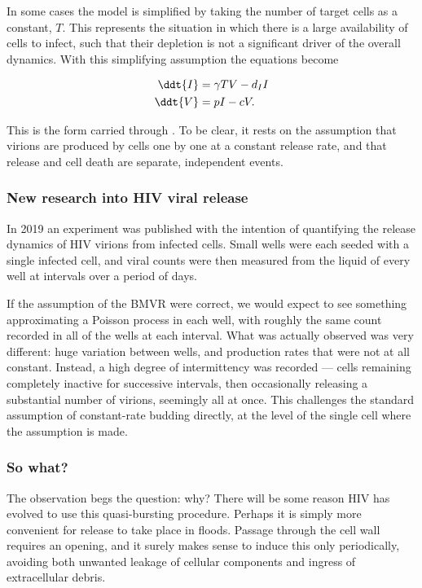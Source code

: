 \noindent
In some cases the model is simplified by taking the number of target cells as a
constant, $T$. This represents the situation in which there is a large
availability of cells to infect, such that their depletion is not a significant
driver of the overall dynamics. With this simplifying assumption the equations
become

\begin{align*}
\ddt{I} & = \gamma T V - d_I I\\
\ddt{V}& = p I - c V.
\end{align*}

\noindent
This is the form carried through
. To be clear, it rests on the
assumption that virions are produced by cells one by one at a constant release
rate, and that release and cell death are separate, independent events.

\subsubsection*{New research into HIV viral release}

In 2019 an experiment was published \cite{hataye2019principles} with the
intention of quantifying the release
dynamics of HIV virions from infected cells. Small wells were each seeded with
a single infected cell, and viral counts were then measured from the liquid of
every well at intervals over a period of days.

If the assumption of the BMVR were correct, we would expect to see something
approximating a Poisson process in each well, with roughly the same count
recorded in all of the wells at each interval. What was actually observed was
very different: huge variation between wells, and production rates that were
not at all constant. Instead, a high degree of intermittency was recorded ---
cells remaining completely inactive for successive intervals, then occasionally
releasing a substantial number of virions, seemingly all at once. This
challenges the standard assumption of constant-rate budding directly, at the
level of the single cell where the assumption is made.

\subsubsection*{So what?}

The observation begs the question: why? There will be some reason HIV has
evolved to use this quasi-bursting procedure. Perhaps it is simply more
convenient for release to take place in floods. Passage through the cell wall
requires an opening, and it surely makes sense to induce this only
periodically, avoiding both unwanted leakage of cellular components and ingress
of extracellular debris.

